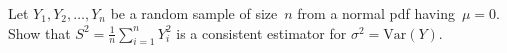 \begin{problem}
   Let ${Y_1,Y_2,\ldots,Y_n}$ be a random sample of size~$n$ from a normal pdf having~${\mu = 0}$.  Show that ${S^2 = \frac{1}{n} \sum_{i=1}^{n} Y_{i}^2}$ is a consistent estimator for ${\sigma^{2} = \text{Var}(Y)}$.
\end{problem}

